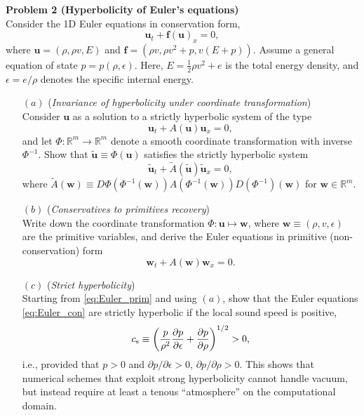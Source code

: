 \documentclass[letter,11pt]{article}
\newcommand{\Rm}{\mathbb{R}^m}
\begin{document}
{\noindent\large\textbf{Problem 2 (Hyperbolicity of Euler's equations)}}\\ %

\noindent Consider the 1D Euler equations in conservation form,
\begin{equation}
    \mathbf{u}_t + \mathbf{f}(\mathbf{u})_x = 0, \label{eq:Euler_con}
\end{equation}
where $\mathbf{u} = (\rho, \rho v, E)$ and $\mathbf{f} = (\rho v, \rho v^2 + p, v(E+p))$. Assume a general equation of state $p = p(\rho,\epsilon)$. Here, $E=\frac{1}{2}\rho v^2 + e$ is the total energy density, and $\epsilon = e/\rho$ denotes the specific internal energy.

\begin{itemize}
  \item[$(a)$] (\emph{Invariance of hyperbolicity under coordinate transformation}) \\
  Consider $\mathbf{u}$ as a solution to a strictly hyperbolic system of the type
  \begin{equation}
    \mathbf{u}_t + A(\mathbf{u})\mathbf{u}_x = 0,
  \end{equation}
  and let $\Phi: \Rm \rightarrow \Rm$ denote a smooth coordinate transformation with inverse $\Phi^{-1}$. Show that $\tilde{\mathbf{u}}\equiv \Phi(\mathbf{u})$ satisfies the strictly hyperbolic system
  \begin{equation}
    \tilde{\mathbf{u}}_t + \tilde{A}(\tilde{\mathbf{u}})\tilde{\mathbf{u}}_x = 0,
  \end{equation}
  where $\tilde{A}(\mathbf{w})\equiv D\Phi(\Phi^{-1}(\mathbf{w}))A(\Phi^{-1}(\mathbf{w}))D(\Phi^{-1})(\mathbf{w})$ for $\mathbf{w}\in \Rm$.

  \item[$(b)$] (\emph{Conservatives to primitives recovery})\\
    Write down the coordinate transformation $\Phi: \mathbf{u}\mapsto \mathbf{w}$, where $\mathbf{w}\equiv (\rho,v,\epsilon)$ are the primitive variables, and derive the Euler equations in primitive (non-conservation) form
    \begin{equation}
      \mathbf{w}_t + A(\mathbf{w})\mathbf{w}_x = 0. \label{eq:Euler_prim}
    \end{equation}

  \item[$(c)$] (\emph{Strict hyperbolicity})\\
  Starting from \eqref{eq:Euler_prim} and using $(a)$, show that the Euler equations \eqref{eq:Euler_con} are strictly hyperbolic if the local sound speed is positive,
    \begin{equation}
      c_{\rm s} \equiv \left(\frac{p}{\rho^2}\frac{\partial p}{\partial \epsilon} + \frac{\partial p}{\partial\rho}\right)^{1/2} > 0,
    \end{equation}
    i.e., provided that $p>0$ and $\partial p/\partial \epsilon > 0$, $\partial p/\partial\rho > 0$. This shows that numerical schemes that exploit strong hyperbolicity cannot handle vacuum, but instead require at least a tenous ``atmosphere'' on the computational domain.
\end{itemize}
\end{document}
